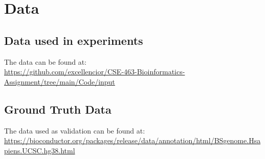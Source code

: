 \section{Data}
\subsection{Data used in experiments}
The data can be found at: \\
\url{https://github.com/excellencior/CSE-463-Bioinformatics-Assignment/tree/main/Code/input}

\subsection{Ground Truth Data}
The data used as validation can be found at: \\
\url{https://bioconductor.org/packages/release/data/annotation/html/BSgenome.Hsapiens.UCSC.hg38.html}
